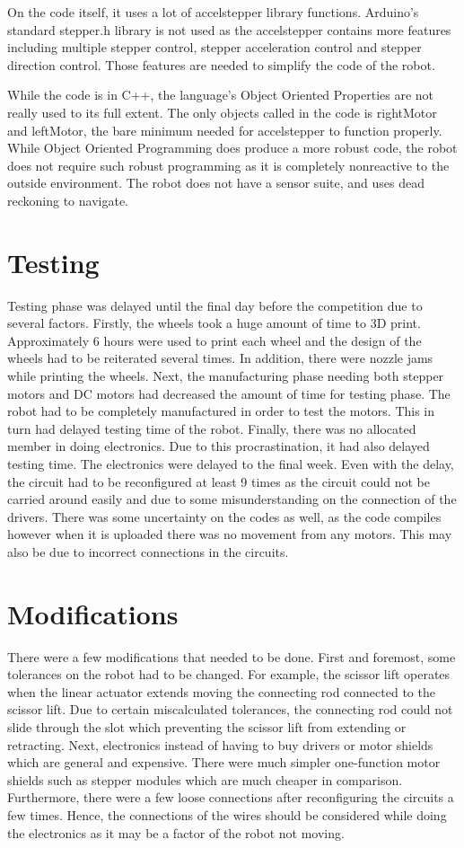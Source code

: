\documentclass[12pt]{report}
\begin{document}
On the code itself, it uses a lot of accelstepper library functions. Arduino's standard stepper.h library is not used as the accelstepper contains more features including multiple stepper control, stepper acceleration control and stepper direction control. Those features are needed to simplify the code of the robot. 

While the code is in C++, the language's Object Oriented Properties are not really used to its full extent. The only objects called in the code is rightMotor and leftMotor, the bare minimum needed for accelstepper to function properly. While Object Oriented Programming does produce a more robust code, the robot does not require such robust programming as it is completely nonreactive to the outside environment. The robot does not have a sensor suite, and uses dead reckoning to navigate.

\section{Testing}
Testing phase was delayed until the final day before the competition due to several factors. Firstly, the wheels took a huge amount of time to 3D print. Approximately 6 hours were used to print each wheel and the design of the wheels had to be reiterated several times. In addition, there were nozzle jams while printing the wheels. Next, the manufacturing phase needing both stepper motors and DC motors had decreased the amount of time for testing phase. The robot had to be completely manufactured in order to test the motors. This in turn had delayed testing time of the robot. Finally, there was no allocated member in doing electronics. Due to this procrastination, it had also delayed testing time. The electronics were delayed to the final week. Even with the delay, the circuit had to be reconfigured at least 9 times as the circuit could not be carried around easily and due to some misunderstanding on the connection of the drivers. There was some uncertainty on the codes as well, as the code compiles however when it is uploaded there was no movement from any motors. This may also be due to incorrect connections in the circuits.

\section{Modifications}
There were a few modifications that needed to be done. First and foremost, some tolerances on the robot had to be changed. For example, the scissor lift operates when the linear actuator extends moving the connecting rod connected to the scissor lift. Due to certain miscalculated tolerances, the connecting rod could not slide through the slot which preventing the scissor lift from extending or retracting. Next, electronics instead of having to buy drivers or motor shields which are general and expensive. There were much simpler one-function motor shields such as stepper modules which are much cheaper in comparison. Furthermore, there were a few loose connections after reconfiguring the circuits a few times. Hence, the connections of the wires should be considered while doing the electronics as it may be a factor of the robot not moving. 
 
\end{document}
